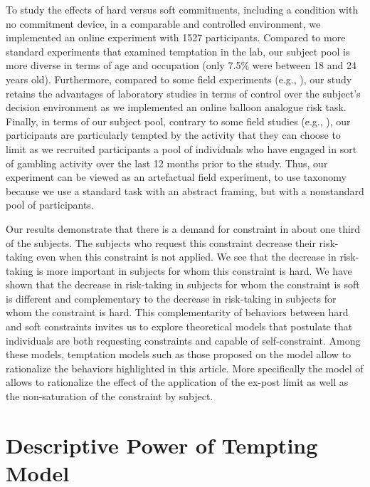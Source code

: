 \documentclass[
]{book}
\begin{document}
To study the effects of hard versus soft commitments, including a condition with
no commitment device, in a comparable and controlled environment, we implemented
an online experiment with 1527 participants.
Compared to more standard experiments that examined temptation in the lab, our
subject pool is more diverse in terms of age and occupation (only 7.5\% were
between 18 and 24 years old).
Furthermore, compared to some field experiments (e.g., \citet{ashraf2006tying}), our
study retains the advantages of laboratory studies in terms of control over the
subject's decision environment as we implemented an online balloon analogue risk
task.
Finally, in terms of our subject pool, contrary to some field studies (e.g.,
\citet{milkman2014holding}), our participants are particularly tempted by the activity
that they can choose to limit as we recruited participants a pool of individuals
who have engaged in sort of gambling activity over the last 12 months prior to
the study.
Thus, our experiment can be viewed as an artefactual field experiment, to use
\citet{harrison2004field} taxonomy because we use a standard task with an abstract
framing, but with a nonstandard pool of participants.

Our results demonstrate that there is a demand for constraint in about one third
of the subjects.
The subjects who request this constraint decrease their risk-taking even when
this constraint is not applied.
We see that the decrease in risk-taking is more important in subjects for whom
this constraint is hard.
We have shown that the decrease in risk-taking in subjects for whom the
constraint is soft is different and complementary to the decrease in
risk-taking in subjects for whom the constraint is hard.
This complementarity of behaviors between hard and soft constraints
invites us to explore theoretical models that postulate that individuals are
both requesting constraints and capable of self-constraint.
Among these models, temptation models such as those proposed on the
\citet{gul2001temptation} model allow to rationalize the behaviors highlighted in
this article.
More specifically the model of \citet{noor2015menu} allows to rationalize the
effect of the application of the ex-post limit as well as the non-saturation of
the constraint by subject.

\hypertarget{tempting-lab}{%
\chapter{Descriptive Power of Tempting Model}\label{tempting-lab}}
\end{document}
